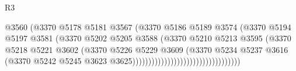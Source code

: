 \begin{lexlean}{R3}
\begin{coremodule}
                                                      @3560
                                                      (@3370
                                                        @5178
                                                        @5181
                                                        @3567
                                                        (@3370
                                                          @5186
                                                          @5189
                                                          @3574
                                                          (@3370
                                                            @5194
                                                            @5197
                                                            @3581
                                                            (@3370
                                                              @5202
                                                              @5205
                                                              @3588
                                                              (@3370
                                                                @5210
                                                                @5213
                                                                @3595
                                                                (@3370
                                                                  @5218
                                                                  @5221
                                                                  @3602
                                                                  (@3370
                                                                    @5226
                                                                    @5229
                                                                    @3609
                                                                    (@3370
                                                                      @5234
                                                                      @5237
                                                                      @3616
                                                                      (@3370
                                                                        @5242
                                                                        @5245
                                                                        @3623
                                                                        @3625))))))))))))))))))))))))))))))))))

\end{coremodule}
\end{lexlean}
